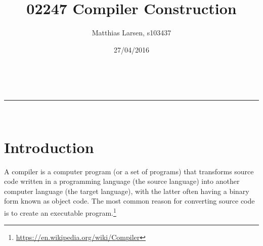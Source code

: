 \documentclass[a4paper,11pt]{article}
\makeatletter
\newcommand{\linia}{\rule{\linewidth}{0.5pt}}
\theoremstyle{mytheor}
\renewcommand{\maketitle}{
\begin{center}
\vspace{2ex}
{\huge \textsc{\@title}}
\vspace{1ex}
\\
\linia\\
\@author \hfill \@date
\vspace{4ex}
\end{center}
}
\makeatother
\begin{document}
\title{02247 Compiler Construction}

\author{Matthias Larsen, s103437}

\date{27/04/2016}

\maketitle










\section*{Introduction}
A compiler is a computer program (or a set of programs) that transforms source code written in a programming language (the source language) into another computer language (the target language), with the latter often having a binary form known as object code. The most common reason for converting source code is to create an executable program.\footnote{\url{https://en.wikipedia.org/wiki/Compiler}}
\end{document}
